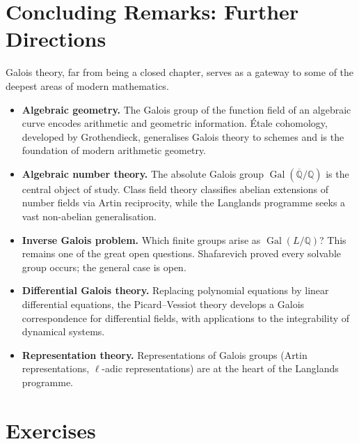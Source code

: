 \documentclass[12pt,a4paper,openany]{book}
\theoremstyle{definition}
\theoremstyle{remark}
\newcommand{\Q}{\mathbb{Q}}
\DeclareMathOperator{\Gal}{Gal}
\begin{document}
\section{Concluding Remarks: Further Directions}
\label{sec:further}

Galois theory, far from being a closed chapter, serves as a gateway to
some of the deepest areas of modern mathematics.

\begin{itemize}
\item \textbf{Algebraic geometry.}\;
The Galois group of the function field of an algebraic curve encodes
arithmetic and geometric information.  \'Etale cohomology, developed by
Grothendieck, generalises Galois theory to schemes and is the foundation of
modern arithmetic geometry.

\item \textbf{Algebraic number theory.}\;
The absolute Galois group $\Gal(\overline{\Q}/\Q)$ is the central object of
study.  Class field theory classifies abelian extensions of number fields via
Artin reciprocity, while the Langlands programme seeks a vast non-abelian
generalisation.

\item \textbf{Inverse Galois problem.}\;
Which finite groups arise as $\Gal(L/\Q)$?  This remains one of the great
open questions.  Shafarevich proved every solvable group occurs; the general
case is open.

\item \textbf{Differential Galois theory.}\;
Replacing polynomial equations by linear differential equations, the
Picard--Vessiot theory develops a Galois correspondence for differential
fields, with applications to the integrability of dynamical
systems.

\item \textbf{Representation theory.}\;
Representations of Galois groups (Artin representations, $\ell$-adic
representations) are at the heart of the Langlands
programme.
\end{itemize}

\section{Exercises}
\label{sec:ch13-exercises}
\end{document}
